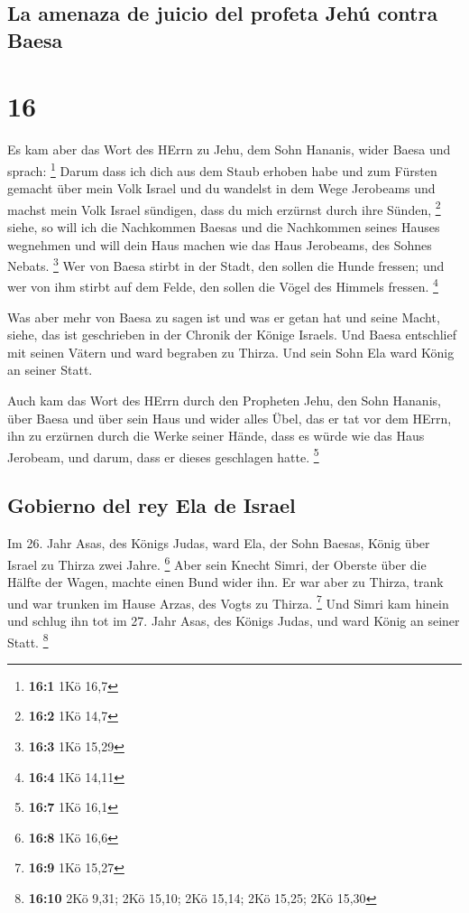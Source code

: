 \hypertarget{la-amenaza-de-juicio-del-profeta-jehuxfa-contra-baesa}{%
\subsection{La amenaza de juicio del profeta Jehú contra
Baesa}\label{la-amenaza-de-juicio-del-profeta-jehuxfa-contra-baesa}}

\hypertarget{section-15}{%
\section{16}\label{section-15}}

 Es kam aber das Wort des HErrn zu Jehu, dem Sohn Hananis,
wider Baesa und sprach: \footnote{\textbf{16:1} 1Kö 16,7} 
Darum dass ich dich aus dem Staub erhoben habe und zum Fürsten gemacht
über mein Volk Israel und du wandelst in dem Wege Jerobeams und machst
mein Volk Israel sündigen, dass du mich erzürnst durch ihre Sünden,
\footnote{\textbf{16:2} 1Kö 14,7}  siehe, so will ich die
Nachkommen Baesas und die Nachkommen seines Hauses wegnehmen und will
dein Haus machen wie das Haus Jerobeams, des Sohnes Nebats. \footnote{\textbf{16:3}
  1Kö 15,29}  Wer von Baesa stirbt in der Stadt, den
sollen die Hunde fressen; und wer von ihm stirbt auf dem Felde, den
sollen die Vögel des Himmels fressen. \footnote{\textbf{16:4} 1Kö 14,11}

 Was aber mehr von Baesa zu sagen ist und was er getan hat
und seine Macht, siehe, das ist geschrieben in der Chronik der Könige
Israels.  Und Baesa entschlief mit seinen Vätern und ward
begraben zu Thirza. Und sein Sohn Ela ward König an seiner Statt.

 Auch kam das Wort des HErrn durch den Propheten Jehu, den
Sohn Hananis, über Baesa und über sein Haus und wider alles Übel, das er
tat vor dem HErrn, ihn zu erzürnen durch die Werke seiner Hände, dass es
würde wie das Haus Jerobeam, und darum, dass er dieses geschlagen hatte.
\footnote{\textbf{16:7} 1Kö 16,1}

\hypertarget{gobierno-del-rey-ela-de-israel}{%
\subsection{Gobierno del rey Ela de
Israel}\label{gobierno-del-rey-ela-de-israel}}

 Im 26. Jahr Asas, des Königs Judas, ward Ela, der Sohn
Baesas, König über Israel zu Thirza zwei Jahre. \footnote{\textbf{16:8}
  1Kö 16,6}  Aber sein Knecht Simri, der Oberste über die
Hälfte der Wagen, machte einen Bund wider ihn. Er war aber zu Thirza,
trank und war trunken im Hause Arzas, des Vogts zu Thirza. \footnote{\textbf{16:9}
  1Kö 15,27}  Und Simri kam hinein und schlug ihn tot im
27. Jahr Asas, des Königs Judas, und ward König an seiner Statt.
\footnote{\textbf{16:10} 2Kö 9,31; 2Kö 15,10; 2Kö 15,14; 2Kö 15,25; 2Kö
  15,30}

